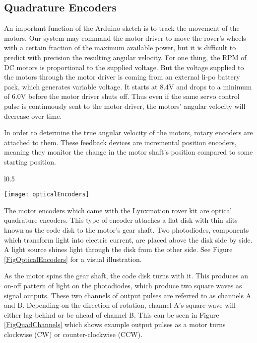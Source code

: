 \subsection{Quadrature Encoders} \label{sectionQuadEncoders}
An important function of the Arduino sketch is to track the movement of the motors. Our system may command the motor driver to move the rover's wheels with a certain fraction of the maximum available power, but it is difficult to predict with precision the resulting angular velocity. For one thing, the RPM of DC motors is proportional to the supplied voltage. But the voltage supplied to the motors through the motor driver is coming from an external li-po battery pack, which generates variable voltage. It starts at 8.4V and drops to a minimum of 6.0V before the motor driver shuts off. Thus even if the same servo control pulse is continuously sent to the motor driver, the motors' angular velocity will decrease over time.

In order to determine the true angular velocity of the motors, rotary encoders are attached to them. These feedback devices are incremental position encoders, meaning they monitor the change in the motor shaft's position compared to some starting position. 

\begin{wrapfigure}{l}{0.5\textwidth}
	\caption{\cite{fig_optical_encoders}}
	\centering
	\texttt{[image: opticalEncoders]}
	\label{FigOpticalEncoders}
\end{wrapfigure}

The motor encoders which came with the Lynxmotion rover kit are optical quadrature encoders. This type of encoder attaches a flat disk with thin slits known as the code disk to the motor's gear shaft. Two photodiodes, components which transform light into electric current, are placed above the disk side by side. A light source shines light through the disk from the other side. See Figure \ref{FigOpticalEncoders} for a visual illustration.

As the motor spins the gear shaft, the code disk turns with it. This produces an on-off pattern of light on the photodiodes, which produce two square waves as signal outputs. These two channels of output pulses are referred to as channels A and B. Depending on the direction of rotation, channel A's square wave will either lag behind or be ahead of channel B. This can be seen in Figure \ref{FigQuadChannels} which shows example output pulses as a motor turns clockwise (CW) or counter-clockwise (CCW). \cite{encoderBlog}

